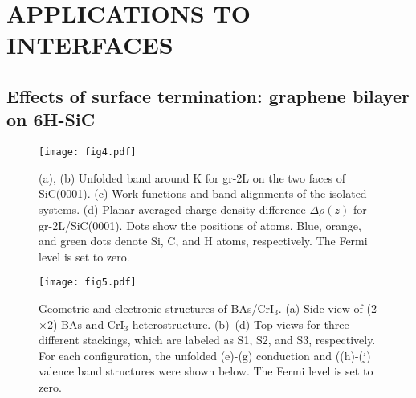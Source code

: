 \documentclass[aps,prb,showpacs,twocolumn,reprint,superscriptaddress]{revtex4-1}
\begin{document}
\section{APPLICATIONS TO INTERFACES}

\subsection{Effects of surface termination: graphene bilayer on 6H-SiC}

%
\begin{figure}
  \texttt{[image: fig4.pdf]}
  \caption{(a), (b) Unfolded band around K for gr-2L on the two faces of SiC(0001).
  (c) Work functions and band alignments of the isolated systems.
  (d) Planar-averaged charge density difference $\Delta \rho(z)$ for gr-2L/SiC(0001).
  Dots show the positions of atoms. Blue, orange, and green dots denote Si, C, and H atoms, respectively. 
  The Fermi level is set to zero.
  }
 \label{fig4}
\end{figure}

\begin{figure*}[ht]
  \texttt{[image: fig5.pdf]}
  \caption{Geometric and electronic structures of BAs/CrI$_3$.
  (a) Side view of (2$\times$2) BAs and CrI$_3$ heterostructure.
  (b)--(d) Top views for three different stackings, which are labeled as S1, S2, and S3, respectively.
  For each configuration, the unfolded (e)-(g) conduction and ((h)-(j) valence band structures were shown
below.
  The Fermi level is set to zero. 
  }
 \label{fig5}
\end{figure*}
\end{document}
